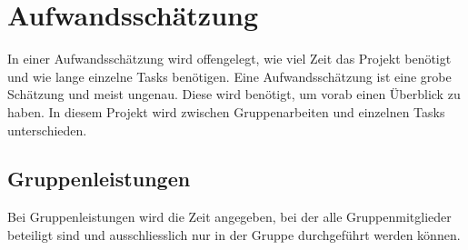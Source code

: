 \newcommand{\trschaetzung}[3]{\rowcolor{lightgray}\textbf{#1} & \textbf{#2} \\* \multicolumn{2}{|l|}{\begin{tabular}[c]{@{}l@{}}#3\end{tabular}} \\ \hline}
\chapter{Aufwandsschätzung}\label{ch:aufwandsschatzung}
In einer Aufwandsschätzung wird offengelegt, wie viel Zeit das Projekt benötigt und wie lange einzelne Tasks benötigen.
Eine Aufwandsschätzung ist eine grobe Schätzung und meist ungenau.
Diese wird benötigt, um vorab einen Überblick zu haben.
In diesem Projekt wird zwischen Gruppenarbeiten und einzelnen Tasks unterschieden. 

\section{Gruppenleistungen}\label{sec:gruppenleistungen}
Bei Gruppenleistungen wird die Zeit angegeben, bei der alle Gruppenmitglieder beteiligt sind
und ausschliesslich nur in der Gruppe durchgeführt werden können.

